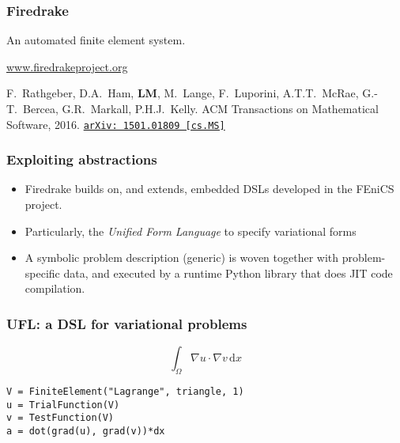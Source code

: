 \documentclass[presentation]{beamer}
\newcommand{\arxivlink}[2]{%
  \href{http://www.arxiv.org/abs/#1}%
  {\texttt{arXiv:\,#1\,[#2]}}%
}
\begin{document}
\begin{frame}
  \frametitle{Firedrake}

  An automated finite element system.

  \begin{center}
    \url{www.firedrakeproject.org}\\
  \end{center}

  \begin{flushright}
    {\scriptsize F.~Rathgeber, D.A.~Ham, \textbf{LM}, M.~Lange,
      F.~Luporini, A.T.T.~McRae, G.-T.~Bercea, G.R.~Markall,
      P.H.J.~Kelly. ACM Transactions on Mathematical Software,
      2016. \arxivlink{1501.01809}{cs.MS}}
  \end{flushright}
\end{frame}

\begin{frame}
  \frametitle{Exploiting abstractions}
  \begin{itemize}
  \item Firedrake builds on, and extends, embedded DSLs developed in
    the FEniCS project.
  \item Particularly, the \emph{Unified Form Language} \parencite{Alnaes:2014} to
    specify variational forms
  \item A symbolic problem description (generic) is woven together with
    problem-specific data, and executed by a runtime Python library
    that does JIT code compilation.
  \end{itemize}
\end{frame}
\begin{frame}[fragile]
  \frametitle{UFL: a DSL for variational problems}
  \begin{equation*}
    \int_\Omega \nabla u \cdot \nabla v\,\text{d}x
  \end{equation*}

\begin{verbatim}
V = FiniteElement("Lagrange", triangle, 1)
u = TrialFunction(V)
v = TestFunction(V)
a = dot(grad(u), grad(v))*dx
\end{verbatim}
\end{frame}
\end{document}
